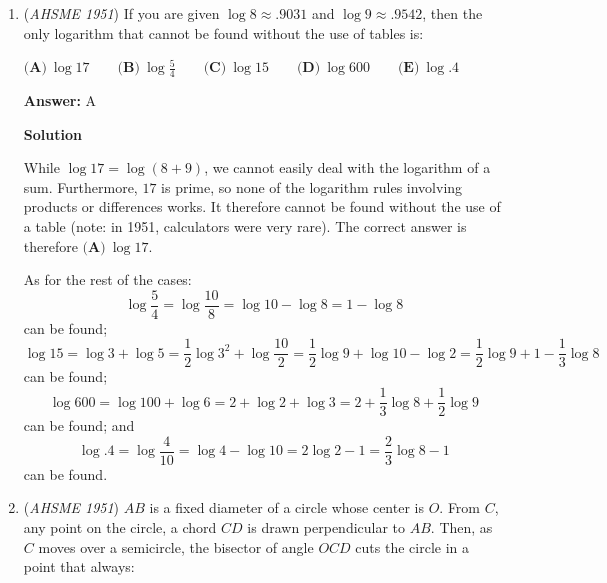 \begin{enumerate}
\textbf{Solution}

Note that $\frac{1}{a}=\frac{1}{x}+\frac{1}{y}$, $\frac{1}{b}=\frac{1}{x}+\frac{1}{z}$, and $\frac{1}{c}=\frac{1}{y}+\frac{1}{z}$. Therefore

 
 \[\frac{1}{x}+\frac{1}{y}+\frac{1}{z}=\frac{\frac{1}{a}+\frac{1}{b}+\frac{1}{c}}{2}\]

 Therefore

 
 \[\frac{1}{x}=\frac{1}{2a}+\frac{1}{2b}+\frac{1}{2c}-\frac{1}{c}=\frac{1}{2a}+\frac{1}{2b}-\frac{1}{2c}\]

 A little algebraic manipulation yields that

 
 \[x=\boxed{\textbf{(E)}\ \frac{2abc}{ac+bc-ab}}\]



	\item (\textit{AHSME 1951}) If you are given $\log 8\approx .9031$ and $\log 9\approx .9542$, then the only logarithm that cannot be found without the use of tables is:


 $\textbf{(A)}\ \log 17\qquad\textbf{(B)}\ \log\frac{5}{4}\qquad\textbf{(C)}\ \log 15\qquad\textbf{(D)}\ \log 600\qquad\textbf{(E)}\ \log .4$

 \textbf{Answer: }A



\textbf{Solution}

While $\log 17 = \log(8 + 9)$, we cannot easily deal with the logarithm of a sum. Furthermore, $17$ is prime, so none of the logarithm rules involving products or differences works. It therefore cannot be found without the use of a table (note: in 1951, calculators were very rare). The correct answer is therefore $\boxed{\textbf{(A)}\ \log 17}$.

 
As for the rest of the cases: 
 \[\log\frac{5}{4} = \log\frac{10}{8} = \log 10 - \log 8 = 1 - \log 8\] can be found; 
 \[\log 15 = \log 3 + \log 5 = \frac{1}{2}\log 3^2 + \log\frac{10}{2} = \frac{1}{2} \log 9 + \log 10 - \log 2 = \frac{1}{2} \log 9 + 1 - \frac{1}{3} \log 8\] can be found; 
 \[\log 600 = \log 100 + \log 6 = 2 + \log 2 + \log 3 = 2 + \frac{1}{3} \log 8 + \frac{1}{2} \log 9\] can be found; and 
 \[\log .4 = \log\frac{4}{10} = \log 4 - \log 10 = 2 \log 2 - 1 = \frac{2}{3} \log 8 - 1\] can be found.

 


	\item (\textit{AHSME 1951}) $AB$ is a fixed diameter of a circle whose center is $O$. From $C$, any point on the circle, a chord $CD$ is drawn perpendicular to $AB$. Then, as $C$ moves over a semicircle, the bisector of angle $OCD$ cuts the circle in a point that always: 



\end{enumerate}
